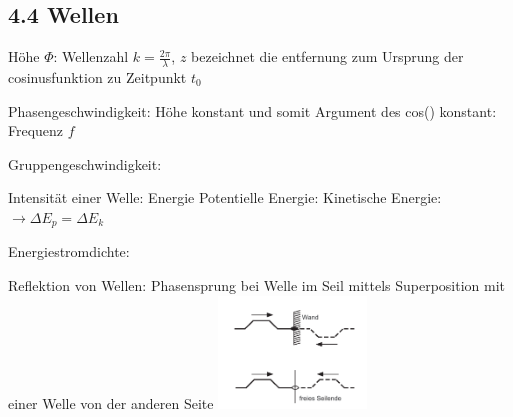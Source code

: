 \subsection{4.4 Wellen}
    Höhe $\Phi$:
    Wellenzahl $k = \frac{2 \pi}{\lambda}$, $z$ bezeichnet die entfernung zum Ursprung der cosinusfunktion zu Zeitpunkt $t_0$

    Phasengeschwindigkeit: Höhe konstant und somit Argument des cos() konstant:
    Frequenz $f$

    Gruppengeschwindigkeit:


    Intensität einer Welle: Energie
    Potentielle Energie:
    Kinetische Energie:
    $\rightarrow \Delta E_p = \Delta E_k$  

    Energiestromdichte:

    Reflektion von Wellen:
    Phasensprung bei Welle im Seil mittels Superposition mit einer Welle von der anderen Seite
    \centering
    \includegraphics[height = 30mm]{src/images/welle_superposition.png}
